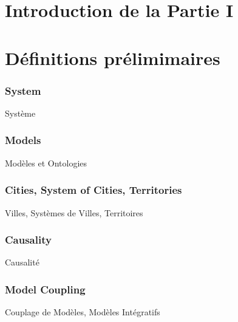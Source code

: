 

\chapter*{Introduction de la Partie I}


























\chapter*{Définitions prélimimaires}


\subsection*{System}{Système}


\subsection*{Models}{Modèles et Ontologies}



\subsection*{Cities, System of Cities, Territories}{Villes, Systèmes de Villes, Territoires}




\subsection*{Causality}{Causalité}



\subsection*{Model Coupling}{Couplage de Modèles, Modèles Intégratifs}











